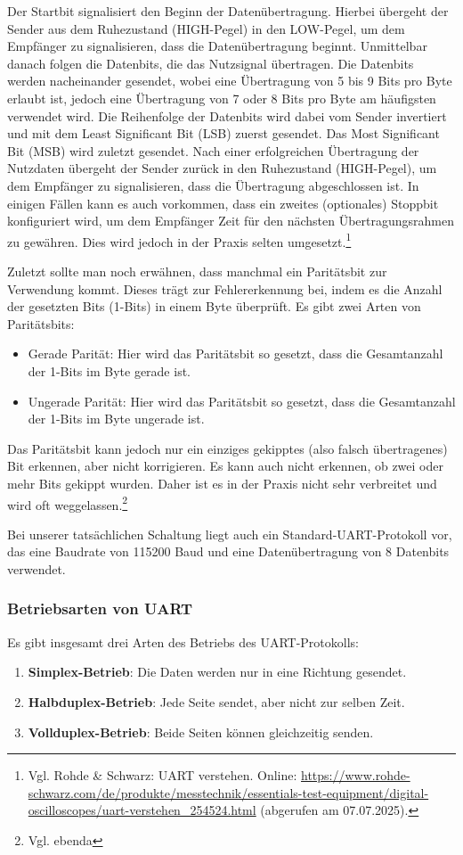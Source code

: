Der Startbit signalisiert den Beginn der Datenübertragung. Hierbei übergeht der Sender aus dem Ruhezustand (HIGH-Pegel) in den LOW-Pegel, um dem Empfänger zu signalisieren, dass die Datenübertragung beginnt. 
Unmittelbar danach folgen die Datenbits, die das Nutzsignal übertragen. Die Datenbits werden nacheinander gesendet, wobei eine Übertragung von 5 bis 9 Bits pro Byte erlaubt ist, jedoch eine Übertragung von 7 oder 8 Bits pro Byte am häufigsten verwendet wird. Die Reihenfolge der Datenbits wird dabei vom Sender invertiert und mit dem Least Significant Bit (LSB) zuerst gesendet. Das Most Significant Bit (MSB) wird zuletzt gesendet.
Nach einer erfolgreichen Übertragung der Nutzdaten übergeht der Sender zurück in den Ruhezustand (HIGH-Pegel), um dem Empfänger zu signalisieren, dass die Übertragung abgeschlossen ist.
In einigen Fällen kann es auch vorkommen, dass ein zweites (optionales) Stoppbit konfiguriert wird, um dem Empfänger Zeit für den nächsten Übertragungsrahmen zu gewähren. Dies wird jedoch in der Praxis selten umgesetzt.\footnote{Vgl. Rohde \& Schwarz: UART verstehen. Online: \url{https://www.rohde-schwarz.com/de/produkte/messtechnik/essentials-test-equipment/digital-oscilloscopes/uart-verstehen_254524.html} (abgerufen am 07.07.2025).}

Zuletzt sollte man noch erwähnen, dass manchmal ein Paritätsbit zur Verwendung kommt. Dieses trägt zur Fehlererkennung bei, indem es die Anzahl der gesetzten Bits (1-Bits) in einem Byte überprüft. Es gibt zwei Arten von Paritätsbits: 
\begin{itemize}
    \item Gerade Parität: Hier wird das Paritätsbit so gesetzt, dass die Gesamtanzahl der 1-Bits im Byte gerade ist.
    \item Ungerade Parität: Hier wird das Paritätsbit so gesetzt, dass die Gesamtanzahl der 1-Bits im Byte ungerade ist.
\end{itemize}

Das Paritätsbit kann jedoch nur ein einziges gekipptes (also falsch übertragenes) Bit erkennen, aber nicht korrigieren. Es kann auch nicht erkennen, ob zwei oder mehr Bits gekippt wurden. Daher ist es in der Praxis nicht sehr verbreitet und wird oft weggelassen.\footnote{Vgl. ebenda}

Bei unserer tatsächlichen Schaltung liegt auch ein Standard-UART-Protokoll vor, das eine Baudrate von 115200 Baud und eine Datenübertragung von 8 Datenbits verwendet.

\subsubsection{Betriebsarten von UART}
Es gibt insgesamt drei Arten des Betriebs des UART-Protokolls:
\begin{enumerate}
    \item \textbf{Simplex-Betrieb}: Die Daten werden nur in eine Richtung gesendet.
    \item \textbf{Halbduplex-Betrieb}: Jede Seite sendet, aber nicht zur selben Zeit.
    \item \textbf{Vollduplex-Betrieb}: Beide Seiten können gleichzeitig senden.
\end{enumerate}


